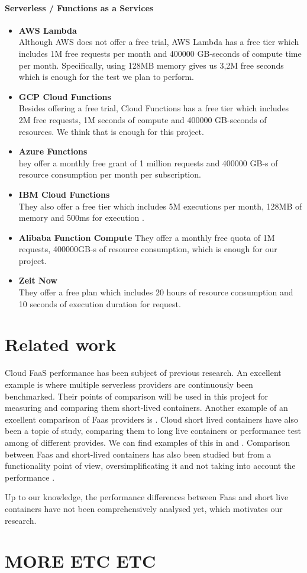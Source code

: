 \documentclass[11pt]{article}
\begin{document}
\paragraph{Serverless / Functions as a Services}
\begin{itemize}
\item \textbf{AWS Lambda} \\
Although AWS does not offer a free trial, AWS Lambda has a free tier which includes 1M free requests per month and 400000 GB-seconds of compute time per month. Specifically, using 128MB memory gives us  3,2M free seconds which is enough for the test we plan to perform.

\item \textbf{GCP Cloud Functions} \\
Besides offering a free trial, Cloud Functions has a free tier which includes 2M free requests, 1M seconds of compute and 400000 GB-seconds of resources. We think that is enough for this project. 

\item \textbf{Azure Functions}\\ 
hey offer a monthly free grant of 1 million requests and 400000 GB-s of resource consumption per month per subscription.

\item \textbf{IBM Cloud Functions} \\
They also offer a free tier which includes 5M executions per month, 128MB of memory and 500ms for execution . 

\item \textbf{Alibaba Function Compute} 
They offer a monthly free quota of 1M requests, 400000GB-s of resource consumption, which is enough for our project.

\item \textbf{Zeit Now} \\
They offer a free plan which includes 20 hours of resource consumption and 10 seconds of execution duration for request.

\end{itemize}

\section{Related work}
Cloud FaaS performance has been subject of previous research. An excellent example is \cite{aa} where multiple serverless providers are continuously been benchmarked. Their points of comparison will be used in this project for measuring and comparing them short-lived containers. Another example of an excellent comparison of Faas providers is \cite{bb}. Cloud short lived containers have also been a topic of study, comparing them to long live containers or performance test among of different provides. We can find examples of this in \cite{cc} and \cite{dd}. Comparison between Faas and short-lived containers has also been studied but from a functionality point of view, oversimplificating it and not taking into account the performance \cite{ee}\cite{ff}\cite{gg}.

Up to our knowledge, the performance differences between Faas and short live containers have not been comprehensively analysed yet, which motivates our research. 

\section{MORE ETC ETC}
\end{document}
